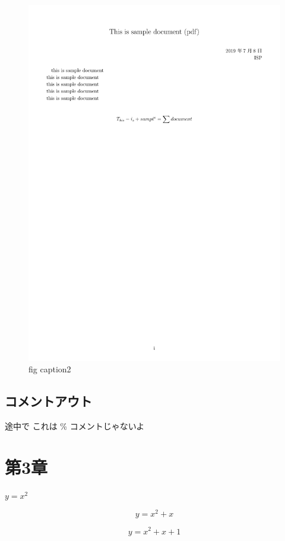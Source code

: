\documentclass[a4paper,11pt]{jarticle}
\begin{document}
        \begin{figure}[h]
            \centering
            \includegraphics[width=\paperwidth]{pdffile.pdf}
            \caption{fig caption2}
            \label{fig:figure}
        \end{figure}

        \subsection*{コメントアウト}
            途中で %
            これは \% コメントじゃないよ

    \section{第3章}
        $y = x^2$

        $$y = x^2 + x$$

        \[y = x^2 + x + 1\]
\end{document}
